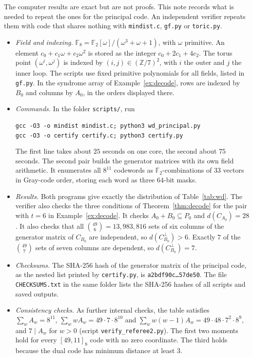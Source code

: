 \documentclass[12pt,letterpaper]{article}
\numberwithin{equation}{section}
\theoremstyle{definition}
\theoremstyle{remark}
\newcommand{\F}{\mathbb{F}}
\newcommand{\Z}{\mathbb{Z}}
\begin{document}
The computer results are exact but are not proofs. This note records what is
needed to repeat the ones for the principal code. An independent verifier
repeats them with code that shares nothing with \texttt{mindist.c},
\texttt{gf.py} or \texttt{toric.py}.
\begin{itemize}[leftmargin=*,itemsep=2pt]
\item \emph{Field and indexing.} $\F_8=\F_2[\omega]/(\omega^3+\omega+1)$, with
$\omega$ primitive. An element $c_0+c_1\omega+c_2\omega^2$ is stored as the
integer $c_0+2c_1+4c_2$. The torus point $(\omega^i,\omega^j)$ is indexed by
$(i,j)\in(\Z/7)^2$, with $i$ the outer and $j$ the inner loop. The scripts use
fixed primitive polynomials for all fields, listed in \texttt{gf.py}. In the
syndrome array of Example~\ref{ex:decode}, rows are indexed by $B_0$ and
columns by $A_0$, in the orders displayed there.
\item \emph{Commands.} In the folder \texttt{scripts/}, run
\begin{center}
\texttt{gcc -O3 -o mindist mindist.c; python3 wd\_principal.py}\\
\texttt{gcc -O3 -o certify certify.c; python3 certify.py}
\end{center}
The first line takes about $25$ seconds on one core, the second about $75$
seconds. The second pair builds the
generator matrices with its own field arithmetic. It enumerates all $8^{11}$
codewords as $\F_2$-combinations of $33$ vectors in Gray-code order, storing
each word as three $64$-bit masks.
\item \emph{Results.} Both programs give exactly the distribution of
Table~\ref{tab:wd}. The verifier also checks the three conditions of
Theorem~\ref{thm:decode} for the pair with $t=6$ in Example~\ref{ex:decode}.
It checks $A_0+B_0\subseteq P_0$ and $d(C_{A_0})=28$. It also checks that all
$\binom{49}{6}=13{,}983{,}816$ sets of six columns of the generator matrix of
$C_{B_0}$ are independent, so $d(C_{B_0}^\perp)>6$. Exactly $7$ of the
$\binom{49}{7}$ sets of seven columns are dependent, so
$d(C_{B_0}^\perp)=7$.
\item \emph{Checksums.} The SHA-256 hash of the generator matrix of the
principal code, as the nested list printed by \texttt{certify.py}, is
\texttt{a2bdf90c\ldots57de50}. The file \texttt{CHECKSUMS.txt} in the same
folder lists the SHA-256 hashes of all scripts and saved outputs.
\item \emph{Consistency checks.} As further internal checks, the table
satisfies $\sum_wA_w=8^{11}$, $\sum_wwA_w=49\cdot7\cdot8^{10}$ and
$\sum_ww(w-1)A_w=49\cdot48\cdot7^2\cdot8^9$, and $7\mid A_w$ for $w>0$
(script \texttt{verify\_referee2.py}). The first two moments hold for every
$[49,11]_8$ code with no zero coordinate. The third holds because the dual
code has minimum distance at least $3$.
\end{itemize}
\end{document}

